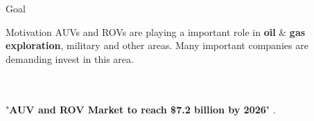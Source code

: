 \begin{frame}[c]{Goal} 
    
    \transdissolve[duration=0.5]
   
    \begin{center}
    \end{center}

\end{frame}


\begin{frame}[t]{Motivation} 
  AUVs and ROVs are playing a important role in \textbf{oil} \& \textbf{gas exploration}, military and other areas. Many important companies are demanding invest in this area.

  \newline
  \newline
  \newline
  \newline
  \newline
  \\
  \vspace{1.5cm}
  \\
  "\textbf{AUV and ROV Market to reach \$7.2 billion by 2026}" \cite{reportlinker}.


\end{frame}




    
   
